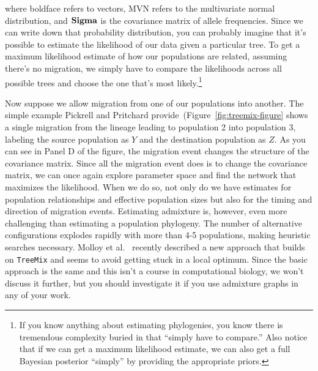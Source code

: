 where boldface refers to vectors, MVN refers to the multivariate
normal distribution, and $\bf Sigma$ is the covariance matrix of
allele frequencies. Since we can write down that probability
distribution, you can probably imagine that it's possible to estimate
the likelihood of our data given a particular tree. To get a maximum
likelihood estimate of how our populations are related, assuming
there's no migration, we simply have to compare the likelihoods across
all possible trees and choose the one that's most likely.\footnote{If
  you know anything about estimating phylogenies, you know there is
  tremendous complexity buried in that ``simply have to compare.''
  Also notice that if we can get a maximum likelihood estimate, we can
  also get a full Bayesian posterior ``simply'' by providing the
  appropriate priors.}

Now suppose we allow migration from one of our populations into
another. The simple example Pickrell and Pritchard
provide~(Figure~\ref{fig:treemix-figure} shows a single migration from
the lineage leading to population 2 into population 3, labeling the
source population as $Y$ and the destination population as $Z$. As you
can see in Panel D of the figure, the migration event changes the
structure of the covariance matrix. Since all the migration event does
is to change the covariance matrix, we can once again explore
parameter space and find the network that maximizes the
likelihood. When we do so, not only do we have estimates for
population relationships and effective population sizes but also for
the timing and direction of migration events. Estimating admixture is,
however, even more challenging than estimating a population
phylogeny. The number of alternative configurations explodes rapidly
with more than 4-5 populations, making heuristic searches
necessary. Molloy et al.~\cite{Molloy-etal-2021} recently described a
new approach that builds on {\tt TreeMix} and seems to avoid getting
stuck in a local optimum. Since the basic approach is the same and
this isn't a course in computational biology, we won't discuss it
further, but you should investigate it if you use admixture graphs in
any of your work.


